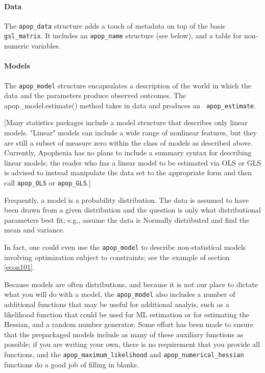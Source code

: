 \paragraph{Data}
The {\tt apop\_data} structure adds a touch of metadata on
top of the basic {\tt gsl\_matrix}. It includes an {\tt apop\_name} structure
(see below), and a table for non-numeric variables. 

\paragraph{Models}
The {\tt apop\_model} structure encapsulates a description of the world
in which the data and the parameters produce observed outcomes. The
apop\_model.estimate() method takes in data and produces an {\tt
apop\_estimate}. 

[Many statistics packages include a model structure that describes only
linear models.  "Linear" models can include a wide range of nonlinear
features, but they are still a subset of measure zero within the class of
models as described above. Currently, Apophenia has no plans to include
a summary syntax for describing linear models; the reader who has a linear
model to be estimated via OLS or GLS is advised to instead manipulate
the data set to the appropriate form and then call {\tt apop\_\-OLS} or
{\tt apop\_\-GLS}.]

Frequently, a model is a probability distribution. The data is assumed
to have been drawn from a given distribution and the question is
only what distributional parameters best fit; e.g., assume the data
is Normally distributed and find the mean and variance.

In fact, one could even use the {\tt apop\_\-model} to describe 
non-statistical models involving optimization subject to constraints;
see the example of section \ref{econ101}.

Because models are often distributions, and because it is not our place
to dictate what you will do with a model, the {\tt apop\_\-model} also includes a
number of additional functions that may be useful for additional analyis,
such as a likelihood function that could be used for ML estimation or
for estimating the Hessian, and a random number generator. Some effort
has been made to ensure that the prepackaged models include as many of
these auxiliary functions as possible; if you are writing your own,
there is no requirement that you provide all functions, and the {\tt apop\_\-maximum\_\-likelihood} 
and {\tt apop\_\-numerical\_\-hessian} functions do a
good job of filling in blanks.

